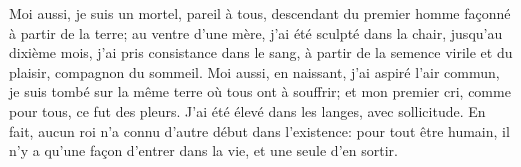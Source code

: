 Moi aussi, je suis un mortel, pareil à tous,
	descendant du premier homme façonné à partir de la terre;
	au ventre d’une mère, j’ai été sculpté dans la chair,
	jusqu’au dixième mois, j’ai pris consistance dans le sang,
	à partir de la semence virile et du plaisir, compagnon du sommeil.
Moi aussi, en naissant, j’ai aspiré l’air commun,
	je suis tombé sur la même terre où tous ont à souffrir;
	et mon premier cri, comme pour tous, ce fut des pleurs.
J’ai été élevé dans les langes, avec sollicitude.
En fait, aucun roi n’a connu d’autre début dans l’existence:
	pour tout être humain, il n’y a qu’une façon d’entrer dans la vie,
	et une seule d’en sortir.
